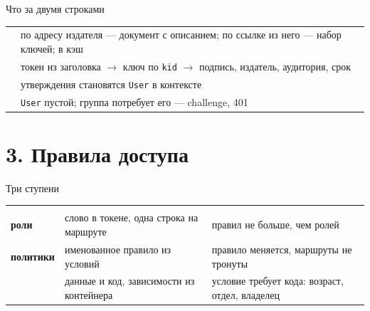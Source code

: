 \documentclass[aspectratio=169,10pt,t]{beamer}
\begin{document}
\begin{frame}{Что за двумя строками}
  \slidetop

  {\renewcommand{\arraystretch}{1.6}
  \begin{tabular}{@{}L{3.2cm}L{9.6cm}@{}}
          & по адресу издателя --- документ с описанием; по ссылке
      из него --- набор ключей; в кэш \\
     & токен из заголовка $\to$ ключ по \texttt{kid} $\to$
      подпись, издатель, аудитория, срок \\
             & утверждения становятся \texttt{User} в контексте \\
           & \texttt{User} пустой; группа потребует его --- challenge, 401 \\
  \end{tabular}}

  \slidegap
\end{frame}

\begin{frame}[plain]
\end{frame}

\section{3. Правила доступа}

\begin{frame}[plain]
\end{frame}

\begin{frame}{Три ступени}
  \slidetop
  {\renewcommand{\arraystretch}{1.5}
  \begin{tabular}{@{}L{3.4cm}L{4.7cm}L{4.7cm}@{}}
    &  &  \\
    \textbf{роли}          & слово в токене, одна строка на маршруте & правил не больше,
      чем ролей \\
    \textbf{политики}      & именованное правило из условий & правило меняется, маршруты
      не тронуты \\
     & данные и код, зависимости из контейнера
      & условие требует кода: возраст, отдел, владелец \\
  \end{tabular}}

  \slidegap
\end{frame}
\end{document}
